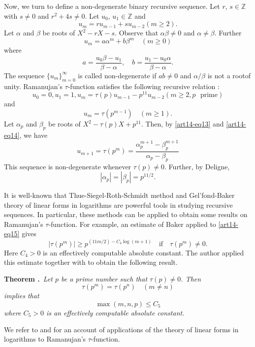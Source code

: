 Now, we turn to define a non-degenerate binary recursive sequence. Let $r$, $s\in \mathbb{Z}$ with $s\neq 0$ and $r^{2}+4s\neq 0$. Let $u_{0}$, $u_{1}\in \mathbb{Z}$ and
$$
u_{m}=ru_{m-1}+su_{m-2}(m\geq 2).
$$
Let $\alpha$ and $\beta$ be roots of $X^{2}-rX-s$. Observe that $\alpha\beta\neq 0$ and $\alpha\neq \beta$. Further
\begin{equation}
u_{m}=a\alpha^{m}+b\beta^{m}\quad (m\geq 0)\label{art14-eq13}
\end{equation}
where
\begin{equation}
a=\frac{u_{0}\beta-u_{1}}{\beta-\alpha},\quad b=\frac{u_{1}-u_{0}\alpha}{\beta-\alpha}.\label{art14-eq14}
\end{equation}
The sequence $\{u_{m}\}^{\infty}_{m=0}$ is called non-degenerate if $ab\neq 0$ and $\alpha/\beta$ is not a root\pageoriginale of unity. Ramanujan's $\tau$-function satisfies the following recursive relation :
$$
u_{0}=0, u_{1}=1, u_{m}=\tau(p)u_{m-1}-p^{11}u_{m-2}(m\geq 2, p\text{~ prime})
$$
and
$$
u_{m}=\tau(p^{m-1})\quad (m\geq 1).
$$
Let $\alpha_{p}$ and $\beta_{p}$ be roots of $X^{2}-\tau(p)X+p^{11}$. Then, by \eqref{art14-eq13} and \eqref{art14-eq14}, we have
\begin{equation}
u_{m+1}=\tau(p^{m})=\frac{\alpha^{m+1}_{p}-\beta^{m+1}_{p}}{\alpha_{p}-\beta_{p}}\label{art14-eq15}
\end{equation}
This sequence is non-degenerate whenever $\tau(p)\neq 0$. Further, by Deligne,
$$
|\alpha_{p}|=|\beta_{p}|=p^{11/2}.
$$

It is well-known that Thue-Siegel-Roth-Schmidt method and Gel'\-fond-Baker theory of linear forms in logarithms are powerful tools in studying recursive sequences. In particular, these methods can be applied to obtain some results on Ramanujan's $\tau$-function. For example, an estimate of Baker \cite{art14-key3} applied to \eqref{art14-eq15} gives
$$
|\tau(p^{m})|\geq p^{(11m/2)-C_{4}\log (m+1)}\quad\text{if}\quad \tau(p^{m})\neq 0.
$$
Here $C_{4}>0$ is an effectively computable absolute constant. The author \cite{art14-key28} applied this estimate together with \cite[Corollary 7.1]{art14-key33} to obtain the following result.

\medskip
\noindent
{\bf Theorem .\label{art14-thm3}}~{\em Let $p$ be a prime number such that $\tau(p)\neq 0$. Then}
$$
\tau(p^{m})=\tau(p^{n})\quad (m\neq n)
$$
{\em implies that}
$$
\max (m,n,p)\leq C_{5}
$$
{\em where $C_{5}>0$ is an effectively computable absolute constant.}

We refer to \cite{art14-key16} and \cite{art14-key28} for an account of applications of the theory of linear forms in logarithms to Ramanujan's $\tau$-function.

